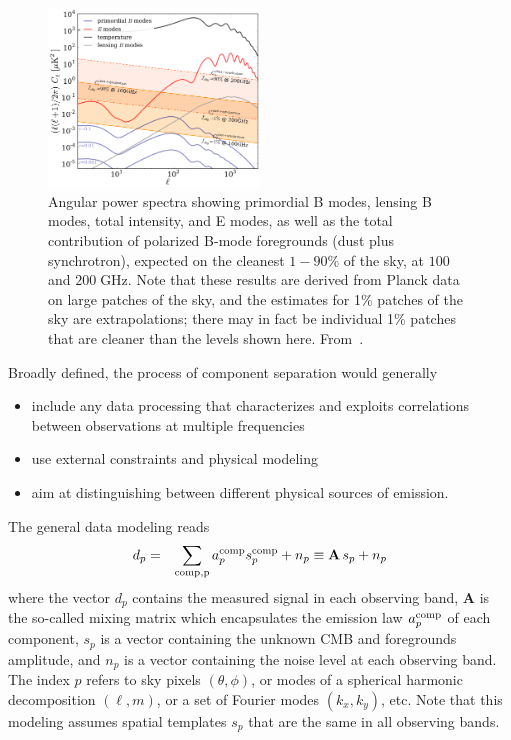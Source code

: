 \begin{figure}[htbp]
\centering
\includegraphics[width=0.5\textwidth]{Analysis/Power_Spectrum_figure_showing_foregrounds.pdf}
\caption{Angular power spectra showing primordial B modes, lensing B modes, total intensity, and E modes, as well as the total contribution of polarized B-mode foregrounds (dust plus synchrotron), expected on the cleanest $1-90\%$ of the sky, at $100$ and $200\;$GHz. Note that these results are derived from Planck data on large patches of the sky, and the estimates for 1\% patches of the sky are extrapolations; there may in fact be individual 1\% patches that are cleaner than the levels shown here.
From~\cite{Errard:2015cxa}.}
\label{fig:power_spectrum_fgs}
\end{figure}

Broadly defined, the process of component separation would generally
\begin{itemize}
	\item include any data processing that characterizes and exploits correlations between observations at multiple frequencies
	\item use external constraints and physical modeling
	\item aim at distinguishing between different physical sources of emission.
\end{itemize}

The general data modeling reads
\begin{eqnarray}
	\centering	
		d_p &=& \sum_{\rm comp, p} a_p^{\rm comp} s^{\rm comp}_p + n_p \equiv \mathbf{A}\,s_p + n_p
	\label{eq:comp_sep_data_modeling}
\end{eqnarray}
where the vector $d_p$ contains the measured signal in each observing band, $\mathbf{A}$ is the so-called mixing matrix which encapsulates the emission law $a_p^{\rm comp}$ of each component, $s_p$ is a vector containing the unknown CMB and foregrounds amplitude, and $n_p$ is a vector containing the noise level at each observing band. The index $p$ refers to sky pixels $\left( \theta, \phi \right)$, or modes of a spherical harmonic decomposition $\left( \ell, m\right)$, or a set of Fourier modes $\left(k_x,k_y\right)$, etc. Note that this modeling assumes spatial templates $s_p$ that are the same in all observing bands.

